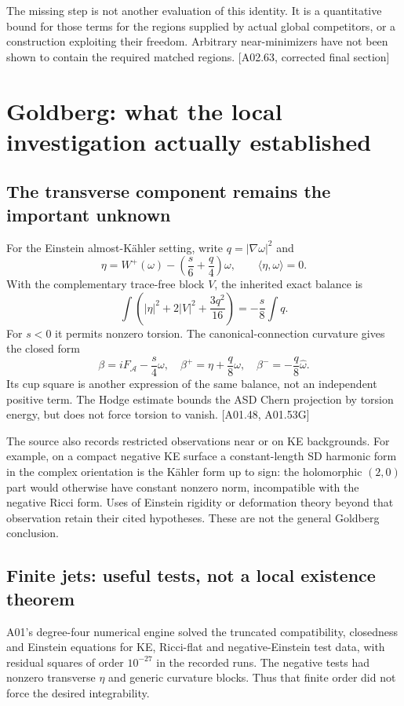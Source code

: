 \documentclass[11pt]{article}
\newcommand{\sref}[1]{\textsf{[#1]}}
\theoremstyle{remark}
\begin{document}
The missing step is not another evaluation of this identity. It is a
quantitative bound for those terms for the regions supplied by actual global
competitors, or a construction exploiting their freedom. Arbitrary
near-minimizers have not been shown to contain the required matched regions.
\sref{A02.63, corrected final section}

\section{Goldberg: what the local investigation actually established}
\label{sec:goldberg}

\subsection{The transverse component remains the important unknown}
For the Einstein almost-K\"ahler setting, write $q=|\nabla\omega|^2$ and
\[
 \eta=W^+(\omega)-\left(\frac s6+\frac q4\right)\omega,
 \qquad \langle\eta,\omega\rangle=0.
\]
With the complementary trace-free block $V$, the inherited exact balance is
\[
 \int\left(|\eta|^2+2|V|^2+\frac{3q^2}{16}\right)
 =-\frac s8\int q.
\]
For $s<0$ it permits nonzero torsion. The canonical-connection curvature gives
the closed form
\[
 \beta=iF_{\mathcal A}-\frac s4\omega,
 \quad \beta^+=\eta+\frac q8\omega,
 \quad \beta^-=-\frac q8\widehat\omega.
\]
Its cup square is another expression of the same balance, not an independent
positive term. The Hodge estimate bounds the ASD Chern projection by torsion
energy, but does not force torsion to vanish. \sref{A01.48, A01.53G}

The source also records restricted observations near or on KE backgrounds.
For example, on a compact negative KE surface a constant-length SD harmonic
form in the complex orientation is the K\"ahler form up to sign: the
holomorphic $(2,0)$ part would otherwise have constant nonzero norm,
incompatible with the negative Ricci form. Uses of Einstein rigidity or
deformation theory beyond that observation retain their cited hypotheses.
These are not the general Goldberg conclusion.

\subsection{Finite jets: useful tests, not a local existence theorem}
A01's degree-four numerical engine solved the truncated compatibility,
closedness and Einstein equations for KE, Ricci-flat and negative-Einstein
test data, with residual squares of order $10^{-27}$ in the recorded runs.
The negative tests had nonzero transverse $\eta$ and generic curvature blocks.
Thus that finite order did not force the desired integrability.
\end{document}
